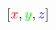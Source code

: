 \documentclass[preview]{standalone}
\begin{document}
$\left[\textcolor[HTML]{FF0000}{x}, \textcolor[HTML]{00FF00}{y}, \textcolor[HTML]{0000FF}{z}\right]$
\end{document}
